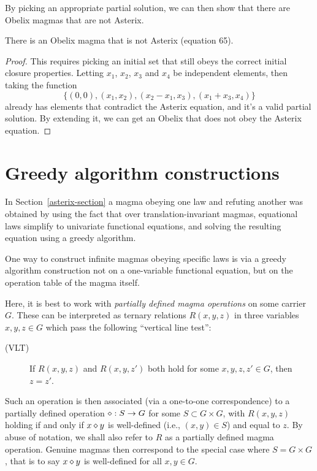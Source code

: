 By picking an appropriate partial solution, we can then show that there are Obelix magmas that are not Asterix.
\begin{corollary}
There is an Obelix magma that is not Asterix (equation 65).
\end{corollary}
\begin{proof}
This requires picking an initial set that still obeys the correct initial closure properties. Letting
$x_1$, $x_2$, $x_3$ and $x_4$ be independent elements, then taking the function
$$\{(0,0), (x_1,x_2), (x_2-x_1, x_3), (x_1+x_3, x_4)\}$$
already has elements that contradict the Asterix equation, and it's a valid partial solution. By extending
it, we can get an Obelix that does not obey the Asterix equation.
\end{proof}

\section{Greedy algorithm constructions}\label{greedy-section}

In Section~\ref{asterix-section} a magma obeying one law and refuting another was obtained by using the
fact that over translation-invariant magmas, equational laws simplify to univariate functional equations,
and solving the resulting equation using a greedy algorithm.

One way to construct infinite magmas obeying specific laws is via a greedy algorithm construction not on a
one-variable functional equation, but on the operation table of the magma itself.

Here, it is best to work with \emph{partially defined magma operations} on some carrier $G$.  These can be interpreted as ternary relations $R(x,y,z)$ in three variables $x,y,z \in G$ which pass the following ``vertical line test'':

\begin{description}
  \item[(VLT)] If $R(x,y,z)$ and $R(x,y,z')$ both hold for some $x,y,z,z' \in G$, then $z=z'$.
\end{description}

Such an operation is then associated (via a one-to-one correspondence) to a partially defined operation $\diamond : S \to G$ for some $S \subset G \times G$, with $R(x,y,z)$ holding if and only if $x \diamond y$ is well-defined (i.e., $(x,y) \in S$) and equal to $z$.  By abuse of notation, we shall also refer to $R$ as a partially defined magma operation.  Genuine magmas then correspond to the special case where $S = G \times G$, that is to say $x \diamond y$ is well-defined for all $x,y \in G$.

